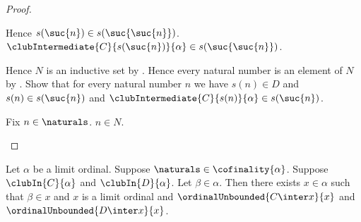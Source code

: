 \begin{proof}
\begin{subproof}
        Hence $s(\suc{n})\in s(\suc{\suc{n}})$.
        $\clubIntermediate{C}{s(\suc{n})}{\alpha}
            \in s(\suc{\suc{n}})$.
    \end{subproof}
    Hence $N$ is an inductive set by .
    Hence every natural number is an element of $N$
        by .
    Show that for every natural number $n$ we have
        $s(n)\in D$ and $s(n)\in s(\suc{n})$ and
        $\clubIntermediate{C}{s(n)}{\alpha}\in s(\suc{n})$.
    \begin{subproof}
        Fix $n\in\naturals$.
        $n\in N$.
    \end{subproof}
\end{proof}

\begin{theorem}\label{two_clubs_have_common_limit_point_above}
    Let $\alpha$ be a limit ordinal.
    Suppose $\naturals\in\cofinality{\alpha}$.
    Suppose $\clubIn{C}{\alpha}$ and $\clubIn{D}{\alpha}$.
    Let $\beta\in\alpha$.
    Then there exists $x\in\alpha$ such that $\beta\in x$ and
        $x$ is a limit ordinal and
        $\ordinalUnbounded{C\inter x}{x}$ and
        $\ordinalUnbounded{D\inter x}{x}$.
\end{theorem}
